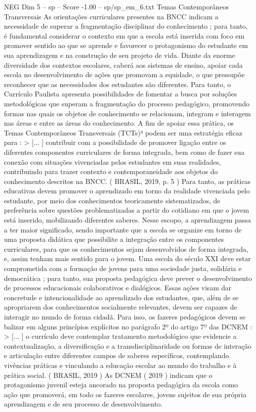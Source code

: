 \begin{textsample}{NEG Dim 5 – sp – Score -1.00 – sp/sp\_em\_6.txt}  \label{ex:f5_neg_212}
Temas Contemporâneos Transversais As orientações curriculares presentes na BNCC indicam a necessidade de superar a fragmentação disciplinar do conhecimento ; para tanto, é fundamental considerar o contexto em que a escola está inserida com foco em promover sentido ao que se aprende e favorecer o protagonismo do estudante em sua aprendizagem e na construção de seu projeto de vida.
Diante da enorme diversidade dos contextos escolares, caberá aos sistemas de ensino, apoiar cada escola no desenvolvimento de ações que promovam a equidade, o que pressupõe reconhecer que as necessidades dos estudantes são diferentes.
Para tanto, o Currículo Paulista apresenta possibilidades de fomentar a busca por soluções metodológicas que superam a fragmentação do processo pedagógico, promovendo formas nas quais os objetos de conhecimento se relacionam, integram e interagem nas áreas e entre as áreas do conhecimento.
A fim de apoiar essa prática, os Temas Contemporâneos Transversais (TCTs)³ podem ser uma estratégia eficaz para : > [... ] contribuir com a possibilidade de promover ligação entre os diferentes componentes curriculares de forma integrada, bem como de fazer sua conexão com situações vivenciadas pelos estudantes em suas realidades, contribuindo para trazer contexto e contemporaneidade aos objetos do conhecimento descritos na BNCC. ( BRASIL, 2019, p. 5 ) Para tanto, as práticas educativas devem promover o aprendizado em torno da realidade vivenciada pelo estudante, por meio dos conhecimentos teoricamente sistematizados, de preferência sobre questões problematizadas a partir do cotidiano em que o jovem está inserido, mobilizando diferentes saberes.
Nesse escopo, a aprendizagem passa a ter maior significado, sendo importante que a escola se organize em torno de uma proposta didática que possibilite a integração entre os componentes curriculares, para que os conhecimentos sejam desenvolvidos de forma integrada, e, assim tenham mais sentido para o jovem.
Uma escola do século XXI deve estar comprometida com a formação de jovens para uma sociedade justa, solidária e democrática ; para tanto, sua proposta pedagógica deve prever o desenvolvimento de processos educacionais colaborativos e dialógicos.
Essas ações visam dar concretude e intencionalidade ao aprendizado dos estudantes, que, além de se apropriarem dos conhecimentos socialmente relevantes, devem ser capazes de interagir no mundo de forma cidadã.
Para isso, os fazeres pedagógicos devem se balizar em alguns princípios explícitos no parágrafo 2º do artigo 7º das DCNEM : > [... ] o currículo deve contemplar tratamento metodológico que evidencie a contextualização, a diversificação e a transdisciplinaridade ou formas de interação e articulação entre diferentes campos de saberes específicos, contemplando vivências práticas e vinculando a educação escolar ao mundo do trabalho e à prática social. ( BRASIL, 2019 ) As DCNEM ( 2019 ) indicam que o protagonismo juvenil esteja ancorado na proposta pedagógica da escola como ação que promoverá, em todo os fazeres escolares, jovens sujeitos de sua própria aprendizagem e de seu processo de desenvolvimento.

\end{textsample}
